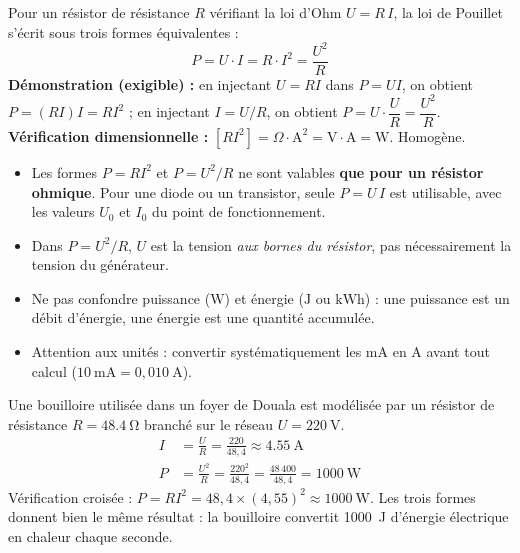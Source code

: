 \documentclass[11pt]{article}
\newcommand{\cle}[1]{{\popxbold\color{popdark}#1}}
\begin{document}
\begin{propriete}
Pour un \cle{résistor} de résistance $R$ vérifiant la loi d'Ohm $U = R\,I$, la loi de Pouillet s'écrit sous trois formes équivalentes :
\[ P = U\cdot I = R\cdot I^2 = \frac{U^2}{R} \]
\textbf{Démonstration (exigible) :} en injectant $U = RI$ dans $P = UI$, on obtient $P = (RI)I = RI^2$ ; en injectant $I = U/R$, on obtient $P = U\cdot\dfrac{U}{R} = \dfrac{U^2}{R}$.
\textbf{Vérification dimensionnelle :} $[RI^2] = \Omega\cdot\mathrm{A}^2 = \mathrm{V}\cdot\mathrm{A} = \mathrm{W}$. Homogène.
\end{propriete}

\begin{attention}
\begin{itemize}
\item Les formes $P = RI^2$ et $P = U^2/R$ ne sont valables \textbf{que pour un résistor ohmique}. Pour une diode ou un transistor, seule $P = U\,I$ est utilisable, avec les valeurs $U_0$ et $I_0$ du point de fonctionnement.
\item Dans $P = U^2/R$, $U$ est la tension \emph{aux bornes du résistor}, pas nécessairement la tension du générateur.
\item Ne pas confondre puissance ($\mathrm{W}$) et énergie ($\mathrm{J}$ ou $\mathrm{kWh}$) : une puissance est un débit d'énergie, une énergie est une quantité accumulée.
\item Attention aux unités : convertir systématiquement les $\mathrm{mA}$ en $\mathrm{A}$ avant tout calcul ($10\ \mathrm{mA} = 0{,}010\ \mathrm{A}$).
\end{itemize}
\end{attention}

\begin{exemplebox}
Une bouilloire utilisée dans un foyer de Douala est modélisée par un résistor de résistance $R = \SI{48,4}{\ohm}$ branché sur le réseau $U = \SI{220}{\volt}$.
\begin{align*}
I &= \frac{U}{R} = \frac{220}{48{,}4} \approx \SI{4,55}{\ampere}\\
P &= \frac{U^2}{R} = \frac{220^2}{48{,}4} = \frac{48\,400}{48{,}4} = \SI{1000}{\watt}
\end{align*}
Vérification croisée : $P = RI^2 = 48{,}4\times(4{,}55)^2 \approx \SI{1000}{\watt}$. Les trois formes donnent bien le même résultat : la bouilloire convertit \SI{1000}{\joule} d'énergie électrique en chaleur chaque seconde.
\end{exemplebox}
\end{document}
